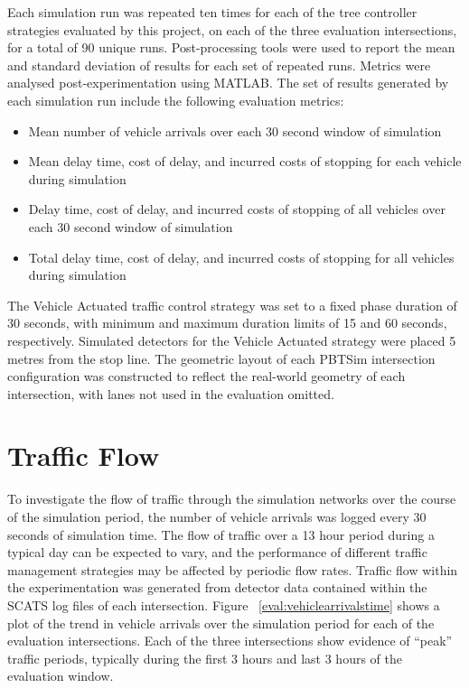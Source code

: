 Each simulation run was repeated ten times for each of the tree controller strategies evaluated by this project, on each of the three evaluation intersections, for a total of 90 unique runs. Post-processing tools were used to report the mean and standard deviation of results for each set of repeated runs. Metrics were analysed post-experimentation using MATLAB. The set of results generated by each simulation run include the following evaluation metrics:

\begin{itemize}
\item Mean number of vehicle arrivals over each 30 second window of simulation
\item Mean delay time, cost of delay, and incurred costs of stopping for each vehicle during simulation
\item Delay time, cost of delay, and incurred costs of stopping of all vehicles over each 30 second window of simulation
\item Total delay time, cost of delay, and incurred costs of stopping for all vehicles during simulation
\end{itemize}

The Vehicle Actuated traffic control strategy was set to a fixed phase duration of 30 seconds, with minimum and maximum duration limits of 15 and 60 seconds, respectively. Simulated detectors for the Vehicle Actuated strategy were placed 5 metres from the stop line. The geometric layout of each PBTSim intersection configuration was constructed to reflect the real-world geometry of each intersection, with lanes not used in the evaluation omitted. 

\section{Traffic Flow}
\label{sec:trafficflow}

To investigate the flow of traffic through the simulation networks over the course of the simulation period, the number of vehicle arrivals was logged every 30 seconds of simulation time. The flow of traffic over a 13 hour period during a typical day can be expected to vary, and the performance of different traffic management strategies may be affected by periodic flow rates. Traffic flow within the experimentation was generated from detector data contained within the SCATS log files of each intersection. Figure ~\ref{eval:vehiclearrivalstime} shows a plot of the trend in vehicle arrivals over the simulation period for each of the evaluation intersections. Each of the three intersections show evidence of ``peak'' traffic periods, typically during the first 3 hours and last 3 hours of the evaluation window.

